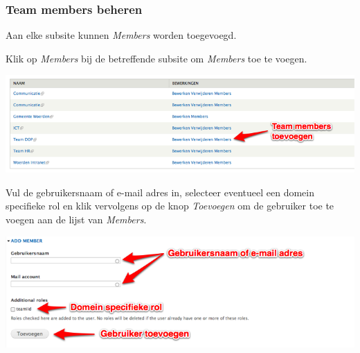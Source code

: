 \subsubsection{Team members beheren}\label{teammembersbeheren}
Aan elke subsite kunnen \emph{Members} worden toegevoegd.

\bigskip

Klik op \emph{Members} bij de betreffende subsite om \emph{Members} toe te voegen.

\begin{center}
	\includegraphics[width=\textwidth]{img/dominion3.png}
\end{center}

\bigskip

Vul de gebruikersnaam of e-mail adres in, selecteer eventueel een domein specifieke rol en klik vervolgens op de knop \emph{Toevoegen} om de gebruiker toe te voegen aan de lijst van \emph{Members}.

\bigskip

\begin{center}
	\includegraphics[width=\textwidth]{img/dominion4.png}
\end{center}
